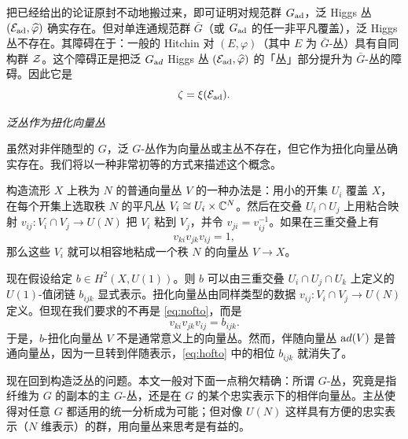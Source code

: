 把已经给出的论证原封不动地搬过来，即可证明对规范群 $G_{\rm{ad}}$，泛 Higgs 丛 $( {\EUE}_{\rm {ad}},\hat\varphi)$ 确实存在。但对单连通规范群 $\bar G$（或 $G_{\rm {ad}}$ 的任一非平凡覆盖），泛 Higgs 丛不存在。其障碍在于：一般的 Hitchin 对 $(E,\varphi)$（其中 $E$ 为 $\bar G$-丛）具有自同构群 $\CZ$。这个障碍正是把泛 $G_{{\rm ad}}$ Higgs 丛 $({\EUE}_{\rm{ad}},\hat\varphi)$ 的「丛」部分提升为 $\bar G$-丛的障碍。因此它是
\setcounter{equation}{12}
\begin{equation}\label{eq:plooo}
\zeta=\xi({\EUE}_{\rm{ad}}).
\end{equation}

\par\medskip\emph{泛丛作为扭化向量丛}

虽然对非伴随型的 $G$，泛 $G$-丛作为向量丛或主丛不存在，但它作为扭化向量丛确实存在。我们将以一种非常初等的方式来描述这个概念。

构造流形 $X$ 上秩为 $N$ 的普通向量丛 $V$ 的一种办法是：用小的开集 $U_i$ 覆盖 $X$，在每个开集上选取秩 $N$ 的平凡丛 $V_i\cong U_i\times \Bbb{C}^N$。然后在交叠 $U_i\cap U_j$ 上用粘合映射 $v_{ij}:V_i\cap V_j\to U(N)$ 把 $V_i$ 粘到 $V_j$，并令 $v_{ji}=v_{ij}^{-1}$。如果在三重交叠上有 %
\setcounter{equation}{13}
\begin{equation}\label{eq:nofto}
v_{ki}v_{jk}v_{ij}=1,
\end{equation}
那么这些 $V_i$ 就可以相容地粘成一个秩 $N$ 的向量丛 $V\to X$。

现在假设给定 $b\in H^2(X,U(1))$。则 $b$ 可以由三重交叠 $U_i\cap U_j\cap U_k$ 上定义的 $U(1)$-值闭链 $b_{ijk}$ 显式表示。扭化向量丛由同样类型的数据 $v_{ij}:V_i\cap V_j\to U(N)$ 定义。但现在我们要求的不再是 \eqref{eq:nofto}，而是
\setcounter{equation}{14}
\begin{equation}\label{eq:hofto}
v_{ki}v_{jk}v_{ij}=b_{ijk}.
\end{equation}
于是，$b$-扭化向量丛 $V$ 不是通常意义上的向量丛。然而，伴随向量丛 ${\rm ad}(V)$ 是普通向量丛，因为一旦转到伴随表示，\eqref{eq:hofto} 中的相位 $b_{ijk}$ 就消失了。

现在回到构造泛丛的问题。本文一般对下面一点稍欠精确：所谓 $G$-丛，究竟是指纤维为 $G$ 的副本的主 $G$-丛，还是在 $G$ 的某个忠实表示下的相伴向量丛。主丛使得对任意 $G$ 都适用的统一分析成为可能；但对像 $U(N)$ 这样具有方便的忠实表示（$N$ 维表示）的群，用向量丛来思考是有益的。

